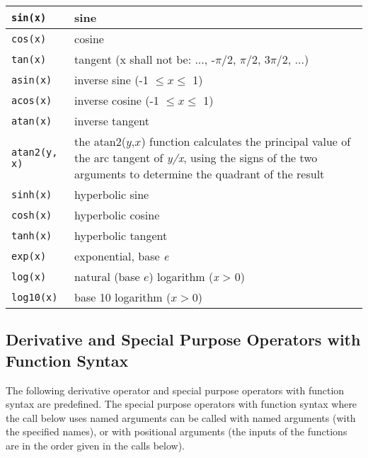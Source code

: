 \begin{longtable}{|l|p{8cm}|} 
\hline \endhead 
\lstinline[basicstyle=\ttfamily]!sin(x)! & sine\\ \hline
\lstinline[basicstyle=\ttfamily]!cos(x)! & cosine\\ \hline
\lstinline[basicstyle=\ttfamily]!tan(x)! & tangent (x shall not be: ..., -$\pi$/2, $\pi$/2, 3$\pi$/2, ...)\\ \hline
\lstinline[basicstyle=\ttfamily]!asin(x)! & inverse sine (-1 $\le x \le$ 1)\\ \hline
\lstinline[basicstyle=\ttfamily]!acos(x)! & inverse cosine (-1 $\le x \le$ 1)\\ \hline
\lstinline[basicstyle=\ttfamily]!atan(x)! & inverse tangent\\ \hline
\lstinline[basicstyle=\ttfamily]!atan2(y, x)! & the atan2($y$,$x$) function calculates the principal value of the arc tangent of \emph{y/x}, using the signs of the two arguments to determine the quadrant of the result\\ \hline
\lstinline[basicstyle=\ttfamily]!sinh(x)! & hyperbolic sine\\ \hline
\lstinline[basicstyle=\ttfamily]!cosh(x)! & hyperbolic cosine\\ \hline
\lstinline[basicstyle=\ttfamily]!tanh(x)! & hyperbolic tangent\\ \hline
\lstinline[basicstyle=\ttfamily]!exp(x)! & exponential, base \emph{e}\\ \hline
\lstinline[basicstyle=\ttfamily]!log(x)! & natural (base $e$) logarithm (\emph{x} \textgreater{} 0)\\ \hline
\lstinline[basicstyle=\ttfamily]!log10(x)! & base 10 logarithm ($x>0$)\\ \hline                                    
\end{longtable}

\subsection{Derivative and Special Purpose Operators with Function Syntax}

The following derivative operator and special purpose operators with
function syntax are predefined. The special purpose operators with
function syntax where the call below uses named arguments can be called
with named arguments (with the specified names), or with positional
arguments (the inputs of the functions are in the order given in the
calls below).

